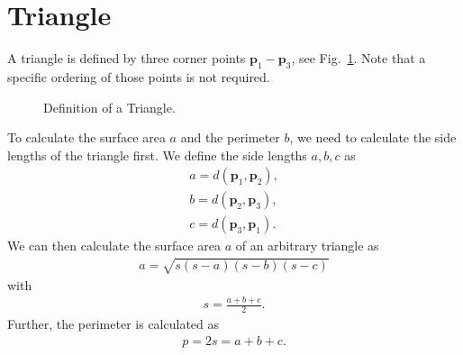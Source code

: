 \section{Triangle}
A triangle is defined by three corner points $\mathbf{p}_1 - \mathbf{p}_3$, see Fig.~\ref{fig:triangle}. Note that a specific ordering of those points is not required.
\begin{figure}[hbt]
    \centering
    \caption{Definition of a Triangle.}
    \label{fig:triangle}
\end{figure}
To calculate the surface area $a$ and the perimeter $b$, we need to calculate the side lengths of the triangle first. We define the side lengths $a,b,c$ as
\begin{align}
    a = d(\mathbf{p}_1, \mathbf{p}_2),\\
    b = d(\mathbf{p}_2, \mathbf{p}_3),\\
    c = d(\mathbf{p}_3, \mathbf{p}_1).
\end{align}
We can then calculate the surface area $a$ of an arbitrary triangle as 
\begin{align}
    a = \sqrt{s(s-a)(s-b)(s-c)}
\end{align}
with
\begin{align}
    s = \frac{a+b+c}{2}.
\end{align}
Further, the perimeter is calculated as
\begin{align}
    p = 2s = a+b+c.
\end{align}